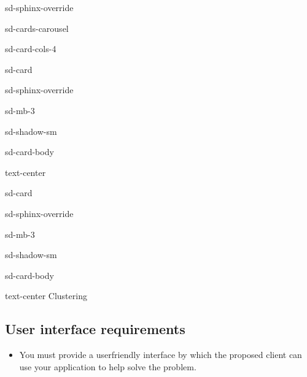 \documentclass[letterpaper,10pt,english]{jupyterBook}
\let\sphinxpxdimen\pdfpxdimen\else\newdimen\sphinxpxdimen
\begin{document}
\begin{sphinxuseclass}{sd-sphinx-override}
\begin{sphinxuseclass}{sd-cards-carousel}
\begin{sphinxuseclass}{sd-card-cols-4}
\begin{sphinxuseclass}{sd-card}
\begin{sphinxuseclass}{sd-sphinx-override}
\begin{sphinxuseclass}{sd-mb-3}
\begin{sphinxuseclass}{sd-shadow-sm}
\begin{sphinxuseclass}{sd-card-body}
\begin{sphinxuseclass}{text-center}
\end{sphinxuseclass}
\end{sphinxuseclass}
\end{sphinxuseclass}
\end{sphinxuseclass}
\end{sphinxuseclass}
\end{sphinxuseclass}
\begin{sphinxuseclass}{sd-card}
\begin{sphinxuseclass}{sd-sphinx-override}
\begin{sphinxuseclass}{sd-mb-3}
\begin{sphinxuseclass}{sd-shadow-sm}
\begin{sphinxuseclass}{sd-card-body}
\begin{sphinxuseclass}{text-center}
\sphinxAtStartPar
Clustering

\noindent\sphinxincludegraphics[height=100\sphinxpxdimen]{{visual3}.png}

\end{sphinxuseclass}
\end{sphinxuseclass}
\end{sphinxuseclass}
\end{sphinxuseclass}
\end{sphinxuseclass}
\end{sphinxuseclass}
\end{sphinxuseclass}
\end{sphinxuseclass}
\end{sphinxuseclass}

\subsection{User interface requirements}
\label{\detokenize{task2_c/task2_part_c:user-interface-requirements}}\label{\detokenize{task2_c/task2_part_c:task2c-user-interface-requirements}}\begin{itemize}
\item {} 
\sphinxAtStartPar
You must provide a user\sphinxhyphen{}friendly interface by which the proposed client can use your application to help solve the problem.

\end{itemize}
\end{document}
